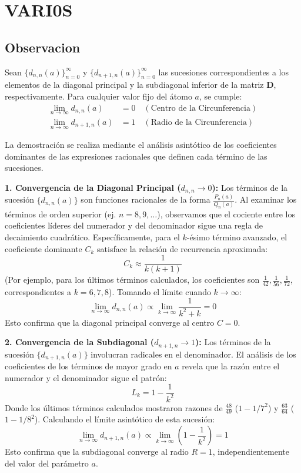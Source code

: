 \documentclass[12pt,a4paper]{article}
\begin{document}
\section{VARI0S}
\subsection*{Observacion}
Sean $\{d_{n,n}(a)\}_{n=0}^\infty$ y $\{d_{n+1,n}(a)\}_{n=0}^\infty$ las sucesiones correspondientes a los elementos de la diagonal principal y la subdiagonal inferior de la matriz $\mathbf{D}$, respectivamente.
Para cualquier valor fijo del átomo $a$, se cumple:
\begin{align}
    \lim_{n \to \infty} d_{n,n}(a) &= 0 \quad (\text{Centro de la Circunferencia}) \\
    \lim_{n \to \infty} d_{n+1,n}(a) &= 1 \quad (\text{Radio de la Circunferencia})
\end{align}



La demostración se realiza mediante el análisis asintótico de los coeficientes dominantes de las expresiones racionales que definen cada término de las sucesiones.

\textbf{1. Convergencia de la Diagonal Principal ($d_{n,n} \to 0$):}
Los términos de la sucesión $\{d_{n,n}(a)\}$ son funciones racionales de la forma $\frac{P_n(a)}{Q_n(a)}$. Al examinar los términos de orden superior (ej. $n=8, 9, \dots$), observamos que el cociente entre los coeficientes líderes del numerador y del denominador sigue una regla de decaimiento cuadrático.
Específicamente, para el $k$-ésimo término avanzado, el coeficiente dominante $C_k$ satisface la relación de recurrencia aproximada:
$$ C_k \approx \frac{1}{k(k+1)} $$
(Por ejemplo, para los últimos términos calculados, los coeficientes son $\frac{1}{42}, \frac{1}{56}, \frac{1}{72}$, correspondientes a $k=6, 7, 8$).
Tomando el límite cuando $k \to \infty$:
$$ \lim_{n \to \infty} d_{n,n}(a) \propto \lim_{k \to \infty} \frac{1}{k^2+k} = 0 $$
Esto confirma que la diagonal principal converge al centro $C=0$.

\textbf{2. Convergencia de la Subdiagonal ($d_{n+1,n} \to 1$):}
Los términos de la sucesión $\{d_{n+1,n}(a)\}$ involucran radicales en el denominador. El análisis de los coeficientes de los términos de mayor grado en $a$ revela que la razón entre el numerador y el denominador sigue el patrón:
$$ L_k = 1 - \frac{1}{k^2} $$
Donde los últimos términos calculados mostraron razones de $\frac{48}{49}$ ($1 - 1/7^2$) y $\frac{63}{64}$ ($1 - 1/8^2$).
Calculando el límite asintótico de esta sucesión:
$$ \lim_{n \to \infty} d_{n+1,n}(a) \propto \lim_{k \to \infty} \left( 1 - \frac{1}{k^2} \right) = 1 $$
Esto confirma que la subdiagonal converge al radio $R=1$, independientemente del valor del parámetro $a$.

\end{document}
